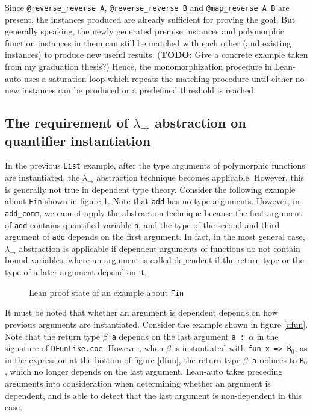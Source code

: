 \noindent Since \texttt{@reverse\_reverse A}, \texttt{@reverse\_reverse B} and \texttt{@map\_reverse A B}
are present, the instances produced are already sufficient for proving the goal.
But generally speaking, the newly generated premise instances and polymorphic function instances
in them can still be matched with each other (and existing instances) to produce new useful results.
(\textbf{TODO:} Give a concrete example taken from my graduation thesis?)
Hence, the monomorphization procedure in Lean-auto uses a saturation loop which
repeats the matching procedure until either no new instances can be produced or a predefined
threshold is reached.

\subsection{The requirement of $\lambda_\to$ abstraction on quantifier instantiation} \label{exqdet}

In the previous \texttt{List} example, after the type arguments of polymorphic functions
are instantiated, the $\lambda_\to$ abstraction technique becomes applicable. However, this is
generally not true in dependent type theory. Consider the following example about \texttt{Fin} shown
in figure \ref{leanfinexplicit}. Note that \texttt{add} has no type arguments. However, in
\texttt{add\_comm}, we cannot apply the abstraction technique because the first argument of
\texttt{add} contains quantified variable \texttt{n}, and the type of the second and third argument
of \texttt{add} depends on the first argument. In fact, in the most general case, $\lambda_\to$
abstraction is applicable if dependent arguments of functions do not contain bound variables,
where an argument is called dependent if the return type or the type of a later argument depend on it.

\begin{figure}
  \begin{CenteredBox}
    
  \end{CenteredBox}
  \caption{Lean proof state of an example about \texttt{Fin}}
  \label{leanfinexplicit}
\end{figure}

\noindent It must be noted that whether an argument is dependent depends on how previous arguments
are instantiated. Consider the example shown in figure \ref{dfun}. Note that the return
type \texttt{$\beta$ a} depends on the last argument \texttt{a : $\alpha$} in the signature of
\texttt{DFunLike.coe}. However, when $\beta$ is instantiated with \texttt{fun x => B$_0$}, as in the
expression at the bottom of figure \ref{dfun}, the return type \texttt{$\beta$ a} reduces to \texttt{B$_0$},
which no longer depends on the last argument. Lean-auto takes preceding arguments into
consideration when determining whether an argument is dependent, and is able to detect
that the last argument is non-dependent in this case.

